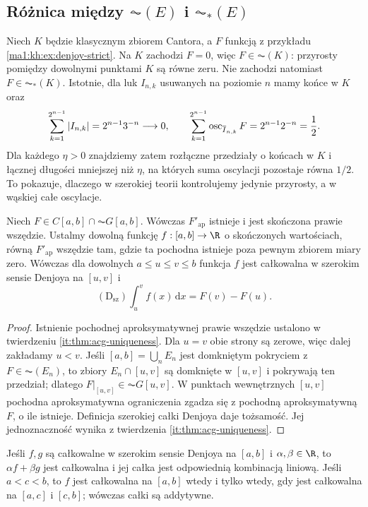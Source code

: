 \subsection*{Różnica między $\AC(E)$ i $\AC_*(E)$}
\begin{przyklad}\label{prz:ac-kontra-acstar}
Niech $K$ będzie klasycznym zbiorem Cantora, a $F$ funkcją z przykładu \ref{ma1:kh:ex:denjoy-strict}. Na $K$ zachodzi $F=0$, więc $F\in\AC(K)$: przyrosty pomiędzy dowolnymi punktami $K$ są równe zeru. Nie zachodzi natomiast $F\in\AC_*(K)$. Istotnie, dla luk $I_{n,k}$ usuwanych na poziomie $n$ mamy końce w $K$ oraz
\[
\sum_{k=1}^{2^{n-1}}|I_{n,k}|=2^{n-1}3^{-n}\longrightarrow0,
\qquad
\sum_{k=1}^{2^{n-1}}\operatorname{osc}_{\overline I_{n,k}}F
=2^{n-1}2^{-n}=\frac12.
\]
Dla każdego $\eta>0$ znajdziemy zatem rozłączne przedziały o końcach w $K$ i łącznej długości mniejszej niż $\eta$, na których suma oscylacji pozostaje równa $1/2$. To pokazuje, dlaczego w szerokiej teorii kontrolujemy jedynie przyrosty, a w wąskiej całe oscylacje.
\end{przyklad}
\begin{twierdzenie}\label{tw:denjoy-szeroka-ftc}
Niech $F\in C[a,b]\cap\AC G[a,b]$. Wówczas $F'_{\mathrm{ap}}$ istnieje i jest skończona prawie wszędzie. Ustalmy dowolną funkcję $f:[a,b]\to\R$ o skończonych wartościach, równą $F'_{\mathrm{ap}}$ wszędzie tam, gdzie ta pochodna istnieje poza pewnym zbiorem miary zero. Wówczas dla dowolnych $a\le u\le v\le b$ funkcja $f$ jest całkowalna w szerokim sensie Denjoya na $[u,v]$ i
\[
 (\mathrm D_{\mathrm{sz}})\int_u^v f(x)\,\mathrm dx=F(v)-F(u).
\]
\end{twierdzenie}
\begin{proof}
Istnienie pochodnej aproksymatywnej prawie wszędzie ustalono w twierdzeniu \ref{it:thm:acg-uniqueness}. Dla $u=v$ obie strony są zerowe, więc dalej zakładamy $u<v$. Jeśli $[a,b]=\bigcup_n E_n$ jest domkniętym pokryciem z $F\in\AC(E_n)$, to zbiory $E_n\cap[u,v]$ są domknięte w $[u,v]$ i pokrywają ten przedział; dlatego $F|_{[u,v]}\in\AC G[u,v]$. W punktach wewnętrznych $[u,v]$ pochodna aproksymatywna ograniczenia zgadza się z pochodną aproksymatywną $F$, o ile istnieje. Definicja szerokiej całki Denjoya daje tożsamość. Jej jednoznaczność wynika z twierdzenia \ref{it:thm:acg-uniqueness}.
\end{proof}
\begin{stwierdzenie}\label{st:denjoy-szeroka-lokalnosc}
Jeśli $f,g$ są całkowalne w szerokim sensie Denjoya na $[a,b]$ i $\alpha,\beta\in\R$, to $\alpha f+\beta g$ jest całkowalna i jej całka jest odpowiednią kombinacją liniową. Jeśli $a<c<b$, to $f$ jest całkowalna na $[a,b]$ wtedy i tylko wtedy, gdy jest całkowalna na $[a,c]$ i $[c,b]$; wówczas całki są addytywne.
\end{stwierdzenie}
